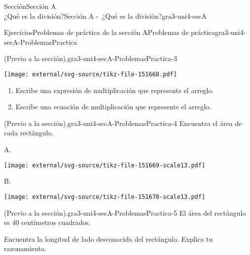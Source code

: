 \begin{sectionptx}{Sección}{{\Large Sección A\\}¿Qué es la división?}{}{Sección A -~¿Qué es la división?}{}{}{gra3-uni4-secA}
%
\begin{exercises-subsection}{Ejercicios}{Problemas de práctica de la sección A}{}{Problemas de práctica}{}{}{gra3-uni4-secA-ProblemasPractica}
\begin{divisionexercise}{1}{(Previo a la sección).}{}{gra3-uni4-secA-ProblemasPractica-3}%
\begin{sidebyside}{2}{0}{0}{0}%
\begin{sbspanel}{0.3}%
\texttt{[image: external/svg-source/tikz-file-151668.pdf]}
\end{sbspanel}%
\begin{sbspanel}{0.7}%
%
\begin{enumerate}[label={(\alph*)}]
\item{}Escribe una expresión de multiplicación que represente el arreglo.%
\item{}Escribe una ecuación de multiplicación que represente el arreglo.%
\end{enumerate}
%
\end{sbspanel}%
\end{sidebyside}%
\end{divisionexercise}%
\begin{divisionexercise}{2}{(Previo a la sección).}{}{gra3-uni4-secA-ProblemasPractica-4}%
Encuentra el área de cada rectángulo.%
\begin{sidebyside}{2}{0.05}{0.05}{0.1}%
\begin{sbspanel}{0.3}%
A.%
\par
\texttt{[image: external/svg-source/tikz-file-151669-scale13.pdf]}
\end{sbspanel}%
\begin{sbspanel}{0.5}%
B.%
\par
\texttt{[image: external/svg-source/tikz-file-151670-scale13.pdf]}
\end{sbspanel}%
\end{sidebyside}%
\end{divisionexercise}%
\begin{divisionexercise}{3}{(Previo a la sección).}{}{gra3-uni4-secA-ProblemasPractica-5}%
El área del rectángulo es 40 centímetros cuadrados.%
\begin{sidebyside}{2}{0}{0}{0}%
\begin{sbspanel}{0.5}%
Encuentra la longitud de lado desconocida del rectángulo. Explica tu razonamiento.%
\end{sbspanel}%
\begin{sbspanel}{0.5}%

\end{sbspanel}
\end{sidebyside}
\end{divisionexercise}
\end{exercises-subsection}
\end{sectionptx}
